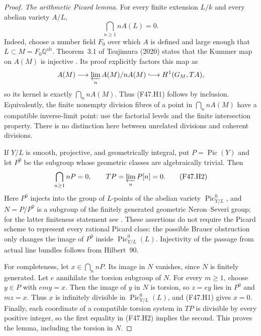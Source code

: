 \begin{proof}
\emph{The arithmetic Picard lemma.}
For every finite extension $L/k$ and every abelian variety $A/L$,
\[
                 \bigcap_{n\geq1}nA(L)=0.                 \tag{F47.H1}
\]
Indeed, choose a number field $F_0$ over which $A$ is defined and large
enough that $L\subset M=F_0\mathbb Q^{\mathrm{ab}}$. Theorem~3.1 of
Tsujimura (2020) states that the Kummer map on $A(M)$ is injective
\cite{Tsujimura2020}. Its proof explicitly factors this map as
\[
 A(M)\longrightarrow\varprojlim_n A(M)/nA(M)
       \lhook\joinrel\longrightarrow H^1(G_M,T A),
\]
so its kernel is exactly $\bigcap_n nA(M)$. Thus (F47.H1) follows by
inclusion. Equivalently, the finite nonempty division fibres of a point
in $\bigcap_n nA(M)$ have a compatible inverse-limit point: use the
factorial levels and the finite intersection property. There is no
distinction here between unrelated divisions and coherent divisions.

If $Y/L$ is smooth, projective, and geometrically integral, put
$P=\operatorname{Pic}(Y)$ and let $P^0$ be the subgroup whose geometric
classes are algebraically trivial. Then
\[
                 \bigcap_{n\geq1}nP=0,
                 \qquad T P=\varprojlim_n P[n]=0.         \tag{F47.H2}
\]
Here $P^0$ injects into the group of $L$-points of the abelian variety
$\operatorname{Pic}^0_{Y/L}$, and
$N=P/P^0$ is a subgroup of the finitely generated geometric
Neron--Severi group; for the latter finiteness statement see
\cite[Theorem~7.3 and Lemma~7.2]{FA_ChengEtAl2021}.
These assertions do not require the Picard scheme
to represent every rational Picard class: the possible Brauer
obstruction only changes the image of $P^0$ inside
$\operatorname{Pic}^0_{Y/L}(L)$. Injectivity of the passage from actual
line bundles follows from Hilbert~90.

For completeness, let $x\in\bigcap_n nP$. Its image in $N$ vanishes,
since $N$ is finitely generated. Let $e$ annihilate the torsion subgroup
of $N$. For every $m\geq1$, choose $y\in P$ with $em y=x$.
Then the image of $y$ in $N$ is torsion, so $z=ey$ lies in $P^0$ and
$mz=x$. Thus $x$ is infinitely divisible in
$\operatorname{Pic}^0_{Y/L}(L)$, and (F47.H1) gives $x=0$. Finally, each
coordinate of a compatible torsion system in $T P$ is divisible by
every positive integer, so the first equality in (F47.H2) implies the
second. This proves the lemma, including the torsion in $N$.


\end{proof}

